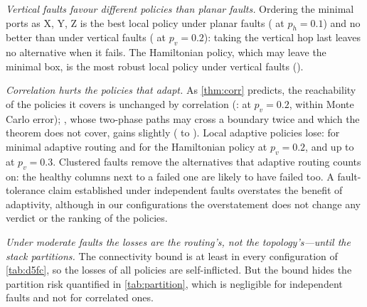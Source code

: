\emph{Vertical faults favour different policies than planar faults.} Ordering the minimal ports as X, Y, Z is the best local policy under planar faults ( at $p_h=0.1$) and no better than  under vertical faults ( at $p_v=0.2$): taking the vertical hop last leaves no alternative when it fails. The Hamiltonian policy, which may leave the minimal box, is the most robust local policy under vertical faults ().

\emph{Correlation hurts the policies that adapt.} As \cref{thm:corr} predicts, the reachability of the policies it covers is unchanged by correlation (:  at $p_v=0.2$, within Monte Carlo error); , whose two-phase paths may cross a boundary twice and which the theorem does not cover, gains slightly ( to ). Local adaptive policies lose:  for minimal adaptive routing and  for the Hamiltonian policy at $p_v=0.2$, and up to  at $p_v=0.3$. Clustered faults remove the alternatives that adaptive routing counts on: the healthy columns next to a failed one are likely to have failed too. A fault-tolerance claim established under independent faults overstates the benefit of adaptivity, although in our configurations the overstatement does not change any  verdict or the ranking of the policies.

\emph{Under moderate faults the losses are the routing's, not the topology's---until the stack partitions.} The connectivity bound is at least  in every configuration of \cref{tab:d5fc}, so the losses of all policies are self-inflicted. But the bound hides the partition risk quantified in \cref{tab:partition}, which is negligible for independent faults and not for correlated ones.

\begin{table}[tbp]
\centering
\caption{Fault tolerance of 3D-FC policies (): exact mean pair reachability over 2,000 fault maps per configuration ($8\times8\times4$). Planar faults with probability $p_h$; vertical faults with marginal $p_v$ and correlation length $\xi$. Local: uniform choice among healthy admissible ports, no backtracking; oracle: some admissible healthy path exists.}
\label{tab:d5fc}
\scriptsize
\setlength{\tabcolsep}{3pt}

\end{table}

